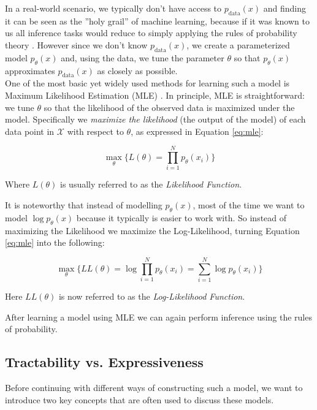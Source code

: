 In a real-world scenario, we typically don't have access to $p_{\text{data}}(x)$ and finding it can be seen as the ''holy grail'' of machine learning, because if it was known to us all inference tasks would reduce to simply applying the 
rules of probability theory \cite{pc_intro}. However since we don't know $p_{\text{data}}(x)$,
we create a parameterized model $p_\theta(x)$ and, using the data, we tune the parameter $\theta$ so that $p_\theta(x)$ approximates $p_{\text{data}}(x)$ as closely as possible. \\

One of the most basic yet widely used methods for learning such a model is Maximum Likelihood Estimation (MLE) \cite{ml_book}. 
In principle, MLE is straightforward: we tune $\theta$ so that the likelihood of the observed data is maximized under the model.
Specifically we \emph{maximize the likelihood} (the output of the model) of each data point in $\mathcal{X}$ with respect to $\theta$, as 
expressed in Equation \ref{eq:mle}: 

\begin{equation}
    \max_{\theta} \{ L(\theta) = \prod_{i=1}^{N} p_\theta(x_i) \}
    \label{eq:mle}
\end{equation}

Where $L(\theta)$ is usually referred to as the \emph{Likelihood Function}.

It is noteworthy that instead of modelling $p_\theta(x)$, most of the time we want to model $\log p_\theta(x)$ because it typically is easier to work with. 
So instead of maximizing the Likelihood we maximize the Log-Likelihood, turning Equation \ref{eq:mle} into the following:

\begin{equation}
    \max_{\theta} \{ LL(\theta) = \log \prod_{i=1}^{N} p_\theta(x_i) = \sum_{i=1}^{N} \log p_\theta(x_i) \}
    \label{eq:log_mle}
\end{equation}

Here $LL(\theta)$ is now referred to as the \emph{Log-Likelihood Function}. 

After learning a model using MLE we can again perform inference using the rules of probability. 

\subsection{Tractability vs. Expressiveness}

Before continuing with different ways of constructing such a model, we want to introduce two key concepts that are often 
used to discuss these models. 

